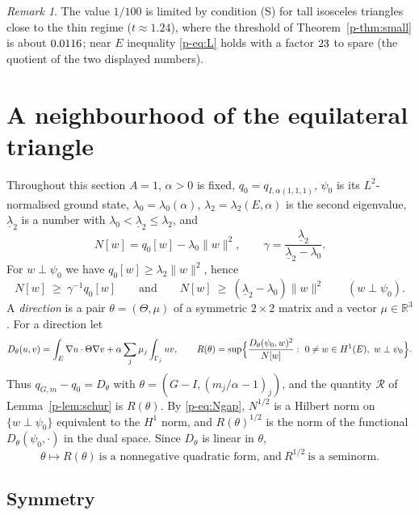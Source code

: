 \documentclass[11pt]{article}
\theoremstyle{remark}
\newtheorem{remark}[theorem]{Remark}
\newcommand{\R}{\mathbb{R}}
\newcommand{\cR}{\mathcal{R}}
\begin{document}
\begin{remark}
The value $1/100$ is limited by condition (S) for tall isosceles triangles close to the thin regime
($t\approx1.24$), where the threshold of Theorem~\ref{p-thm:small} is about $0.0116$; near $E$
inequality \eqref{p-eq:L} holds with a factor $23$ to spare (the quotient of the two
displayed numbers).
\end{remark}

\section{A neighbourhood of the equilateral triangle}\label{p-sec:local}

Throughout this section $A=1$, $\alpha>0$ is fixed, $q_0=q_{I,\alpha(1,1,1)}$, $\psi_0$ is its
$L^2$-normalised ground state, $\lambda_0=\lambda_0(\alpha)$, $\lambda_2=\lambda_2(E,\alpha)$
is the second eigenvalue, $\underline\lambda_2$ is a number with
$\lambda_0<\underline\lambda_2\le\lambda_2$, and
\[
  N[w]=q_0[w]-\lambda_0\|w\|^2,\qquad
  \gamma=\frac{\underline\lambda_2}{\underline\lambda_2-\lambda_0}.
\]
For $w\perp\psi_0$ we have $q_0[w]\ge\lambda_2\|w\|^2$, hence
\begin{equation}\label{p-eq:Ngap}
  N[w]\ \ge\ \gamma^{-1}q_0[w]\qquad\text{and}\qquad N[w]\ \ge\ (\underline\lambda_2-\lambda_0)\|w\|^2
  \qquad(w\perp\psi_0).
\end{equation}
A \emph{direction} is a pair $\theta=(\Theta,\mu)$ of a symmetric $2\times2$ matrix and a
vector $\mu\in\R^3$. For a direction let
\[
  D_\theta(u,v)=\int_E\nabla u\cdot\Theta\nabla v+\alpha\sum_j\mu_j\int_{\Gamma_j}uv,\qquad
  R(\theta)=\sup\Bigl\{\frac{D_\theta(\psi_0,w)^2}{N[w]}:\ 0\ne w\in H^1(E),\ w\perp\psi_0\Bigr\}.
\]
Thus $q_{G,m}-q_0=D_\theta$ with $\theta=(G-I,(m_j/\alpha-1)_j)$, and the quantity $\cR$ of
Lemma~\ref{p-lem:schur} is $R(\theta)$. By \eqref{p-eq:Ngap}, $N^{1/2}$ is a Hilbert norm on
$\{w\perp\psi_0\}$ equivalent to the $H^1$ norm, and $R(\theta)^{1/2}$ is the norm of the
functional $D_\theta(\psi_0,\cdot)$ in the dual space. Since $D_\theta$ is linear in $\theta$,
\begin{equation}\label{p-eq:seminorm}
  \theta\mapsto R(\theta)\ \text{is a nonnegative quadratic form, and}\ R^{1/2}\ \text{is a seminorm.}
\end{equation}

\subsection{Symmetry}
\end{document}
